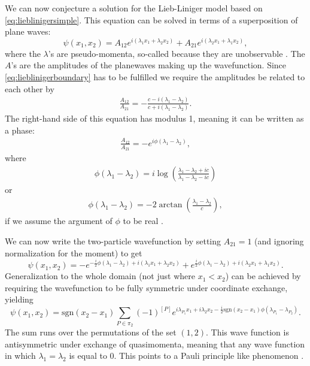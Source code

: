 \documentclass[11pt, a4paper]{report} %
\begin{document}
We can now conjecture a solution for the Lieb-Liniger model based on \cref{eq:lieblinigersimple}.
This equation can be solved in terms of a superposition of plane waves:
\begin{equation}
	\psi(x_1,x_2) = A_{12} e^{i(\lambda_1x_1 + \lambda_2 x_2)} + A_{21} e^{i(\lambda_2 x_1 + \lambda_1 x_2)},
\end{equation}
where the \(\lambda\)'s are pseudo-momenta, so-called because they are unobservable \cite{Franchini2017}.
The \(A\)'s are the amplitudes of the planewaves making up the wavefunction.
Since \cref{eq:lieblinigerboundary} has to be fulfilled we require the amplitudes be related to each other by
\begin{align}
	\frac{A_{12}}{A_{21}} = -\frac{c-i(\lambda_1 - \lambda_2) }{c+i(\lambda_1 - \lambda_2)}.
\end{align}
The right-hand side of this equation has modulus 1, meaning it can be written as a phase:
\begin{align}
	\frac{A_{12}}{A_{21}} = -e^{i\phi(\lambda_1-\lambda_2)},
\end{align}
where \cite{Korepin1993}
\begin{align}
  \phi(\lambda_1-\lambda_2) = i \log(\frac{\lambda_1-\lambda_2 + ic}{\lambda_1-\lambda_2-ic})
\end{align}
or
\begin{align}
	\phi(\lambda_1-\lambda_2) = -2\arctan\left(\frac{\lambda_1-\lambda_2}{c}\right),
\end{align}
if we assume the argument of \(\phi\) to be real \cite{Lieb1963}.

We can now write the two-particle wavefunction by setting \(A_{21}=1\) (and ignoring normalization for the moment) to get
\begin{equation}
	\psi(x_1,x_2) = - e^{-\frac{i}{2}\phi(\lambda_1-\lambda_2)+i(\lambda_1x_1 + \lambda_2 x_2)} + e^{\frac{i}{2}\phi(\lambda_1-\lambda_2)+i(\lambda_2 x_1 + \lambda_1 x_2)}.
\end{equation}
Generalization to the whole domain (not just where \(x_1 < x_2\)) can be achieved by requiring the wavefunction to be fully symmetric under coordinate exchange,
yielding
\begin{equation}
  \psi(x_1,x_2) = \textrm{sgn}(x_2-x_1)\sum_{P\in\pi_2} (-1)^{[P]} e^{i\lambda_{P_1}x_1 + i \lambda_2 x_2- \frac{i}{2} \textrm{sgn}(x_2-x_1)\phi(\lambda_{P_1}-\lambda_{P_2})}.
\end{equation}
The sum runs over the permutations of the set \((1,2)\).
This wave function is antisymmetric under exchange of quasimomenta, meaning that any wave function in which \(\lambda_1=\lambda_2\) is equal to 0.
This points to a Pauli principle like phenomenon \cite{tofind}.
\end{document}
